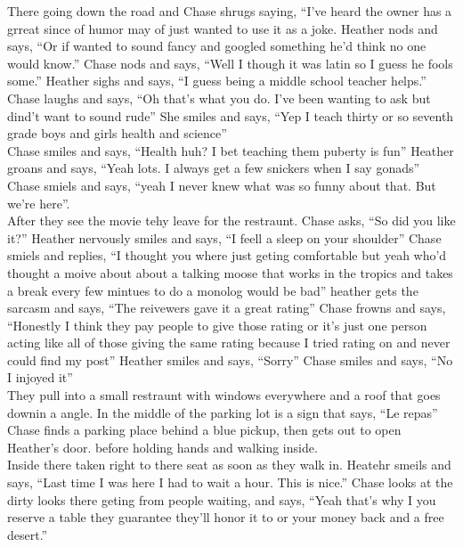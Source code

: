 \documentclass {article}[12pt]
\begin{document}
	There going down the road and Chase shrugs saying, ``I've heard the owner has a grreat since of humor may of just wanted to use it as a joke. Heather nods and says, ``Or if wanted to sound fancy and googled something he'd think no one would know.'' Chase nods and says, ``Well I though it was latin so I guess he fools some.'' Heather sighs and says, ``I guess being a middle school teacher helps.'' Chase laughs and says, ``Oh that's what you do. I've been wanting to ask but dind't want to sound rude'' She smiles and says, ``Yep I teach thirty or so seventh grade boys and girls health and science''\\

	Chase smiles and says, ``Health huh? I bet teaching them puberty is fun'' Heather groans and says, ``Yeah lots. I always get a few snickers when I say gonads'' Chase smiels and says, ``yeah I never knew what was so funny about that. But we're here''.\\
	
	After they see the movie tehy leave for the restraunt. Chase asks, ``So did you like it?'' Heather nervously smiles and says, ``I feell a sleep on your shoulder'' Chase smiels and replies, ``I thought you where just geting comfortable but yeah who'd thought a moive about about a talking moose that works in the tropics and takes a break every few mintues to do a monolog would be bad'' heather gets the sarcasm and says, ``The reivewers gave it a great rating'' Chase frowns and says, ``Honestly I think they pay people to give those rating or it's just one person acting like all of those giving the same rating because I tried rating on and never could find my post'' Heather smiles and says, ``Sorry'' Chase smiles and says, ``No I injoyed it''\\

	They pull into a small restraunt with windows everywhere and a roof that goes downin a angle. In the middle of the parking lot is a sign that says, ``Le repas''\\

	Chase finds a parking place behind a blue pickup, then gets out to open Heather's door. before holding hands and walking inside.\\

	Inside there taken right to there seat as soon as they walk in. Heatehr smeils and says, ``Last time I was here I had to wait a hour. This is nice.'' Chase looks at the dirty looks there geting from people waiting, and says, ``Yeah that's why I you reserve a table they guarantee they'll honor it to or your money back and a free desert.''\\
	
\end{document}
